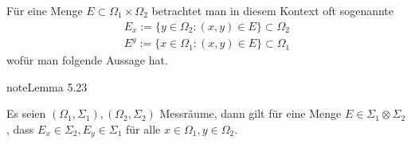 \documentclass[letterpaper,10pt,german]{jupyterBook}
\begin{document}
\sphinxAtStartPar
Für eine Menge \(E\subset\Omega_1\times\Omega_2\) betrachtet man in diesem Kontext oft sogenannte 
\begin{equation*}
\begin{split}E_x := \{y\in \Omega_2: (x,y)\in E\}\subset\Omega_2\\
E^y := \{x\in \Omega_1: (x,y)\in E\}\subset\Omega_1\end{split}
\end{equation*}
\sphinxAtStartPar
wofür man folgende Aussage hat.
\label{masstheorie/integrationstechnik:lem:secmeasure}
\begin{sphinxadmonition}{note}{Lemma 5.23}



\sphinxAtStartPar
Es seien \((\Omega_1,\Sigma_1), (\Omega_2,\Sigma_2)\) Messräume, dann gilt für eine Menge \(E\in \Sigma_1\otimes\Sigma_2\), dass \(E_x\in \Sigma_2, E_y\in\Sigma_1\) für alle \(x\in\Omega_1,y\in\Omega_2\).
\end{sphinxadmonition}
\end{document}
